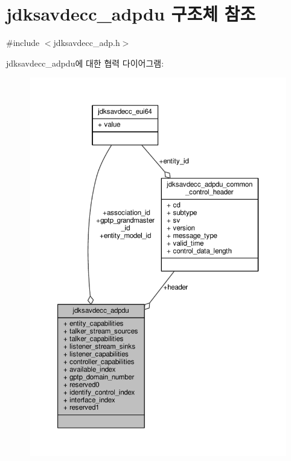 \hypertarget{structjdksavdecc__adpdu}{}\section{jdksavdecc\+\_\+adpdu 구조체 참조}
\label{structjdksavdecc__adpdu}


{\ttfamily \#include $<$jdksavdecc\+\_\+adp.\+h$>$}



jdksavdecc\+\_\+adpdu에 대한 협력 다이어그램\+:
\nopagebreak
\begin{figure}[H]
\begin{center}
\leavevmode
\includegraphics[width=350pt]{structjdksavdecc__adpdu__coll__graph}
\end{center}
\end{figure}
